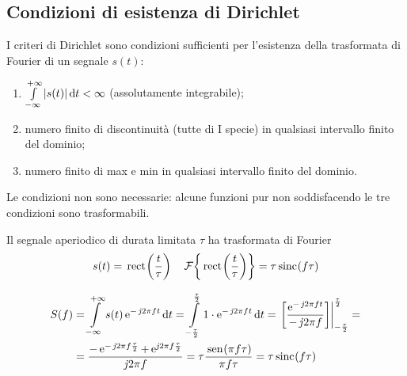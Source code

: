 \subsection{Condizioni di esistenza di Dirichlet}
I criteri di Dirichlet sono condizioni sufficienti per l'esistenza della trasformata di Fourier di un segnale $s(t)$:
\begin{enumerate}
\item $\int\limits_{-\infty}^{+\infty}{\left|{s(t)}\right|}{\,\mathop{}\!\mathrm{d}{t}}<\infty$ (assolutamente integrabile);
\item numero finito di discontinuità (tutte di I specie) in qualsiasi intervallo finito del dominio;
\item numero finito di max e min in qualsiasi intervallo finito del dominio.
\end{enumerate}
\begin{nota}Le condizioni non sono necessarie: alcune funzioni pur non soddisfacendo le tre condizioni sono trasformabili.\end{nota}
\begin{esempio}
Il segnale aperiodico di durata limitata $\tau$ ha trasformata di Fourier
\[s(t)=\,{\operatorname{rect}}^{}\!\left({\frac{t}{\tau}}\right)\quad\operatorname{\mathcal{F}}\!\left\lbrace{\,{\operatorname{rect}}^{}\!\left({\frac{t}{\tau}}\right)}\right\rbrace=\tau\,{\operatorname{sinc}}^{}\!\left({f\tau}\right) \]

\begin{figure}[ht]
\centering
{}\qquad
{}
\end{figure}

\begin{align*}
S(f)&=\intinf{s(t)\e{-\imath 2\pi f t}}{t}
	 =\intd{-\frac{\tau}{2}}{\frac{\tau}{2}}{1\cdot\e{-\imath 2\pi f t}}{t}
	 =\bound{-\frac{\tau}{2}}{\frac{\tau}{2}}{\frac{\e{-\imath 2\pi f t}}{-\imath 2\pi f}}=\\
	&=\frac{-\e{-\imath 2\pi f\frac{\tau}{2}}+\e{\imath 2\pi f\frac{\tau}{2}}}{\imath 2\pi f}
	 =\tau\frac{\sen{\pi f\tau}}{\pi f\tau}
	 =\tau\sinc{f\tau}
\end{align*}
\end{esempio}

